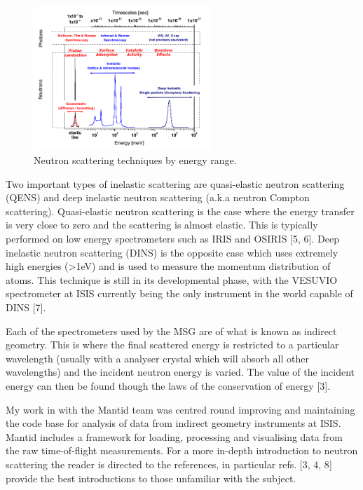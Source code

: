 \documentclass[paper=a4, fontsize=11pt]{scrartcl}	%
\numberwithin{equation}{section}															%
\numberwithin{figure}{section}																%
\numberwithin{table}{section}
\begin{document}
\begin{figure}[H]
\centering
\includegraphics[width=0.6\textwidth]{img/instrument-energy-chart.png}
\caption{Neutron scattering techniques by energy range.}
\label{fig:instrument-energy-chart}
\end{figure}

Two important types of inelastic scattering are quasi-elastic neutron
scattering (QENS) and deep inelastic neutron scattering (a.k.a neutron
Compton scattering). Quasi-elastic neutron scattering is the case where
the energy transfer is very close to zero and the scattering is almost
elastic. This is typically performed on low energy spectrometers such as
IRIS and OSIRIS {[}5, 6{]}. Deep inelastic neutron scattering (DINS) is
the opposite case which uses extremely high energies (\textgreater{}1eV)
and is used to measure the momentum distribution of atoms. This
technique is still in its developmental phase, with the VESUVIO
spectrometer at ISIS currently being the only instrument in the world
capable of DINS {[}7{]}.

Each of the spectrometers used by the MSG are of what is known as
indirect geometry. This is where the final scattered energy is
restricted to a particular wavelength (usually with a analyser crystal
which will absorb all other wavelengths) and the incident neutron energy
is varied. The value of the incident energy can then be found though the
laws of the conservation of energy {[}3{]}.

My work in with the Mantid team was centred round improving and
maintaining the code base for analysis of data from indirect geometry
instruments at ISIS. Mantid includes a framework for loading,
processing and visualising data from the raw time-of-flight
measurements. For a more in-depth introduction to neutron scattering the
reader is directed to the references, in particular refs. {[}3, 4, 8{]}
provide the best introductions to those unfamiliar with the subject.
\end{document}
